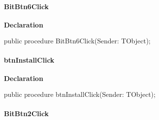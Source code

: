 \documentclass{report}
\newif\ifpdf
\begin{document}
\paragraph*{BitBtn6Click}\hspace*{\fill}

\label{manager.TMnFrm-BitBtn6Click}
\begin{list}{}{
\setlength{\itemindent}{0cm}
\setlength{\listparindent}{0cm}
\setlength{\leftmargin}{\evensidemargin}
\addtolength{\leftmargin}{\tmplength}
\settowidth{\labelsep}{X}
\addtolength{\leftmargin}{\labelsep}
\setlength{\labelwidth}{\tmplength}
}
\item[\textbf{Declaration}\hfill]
\ifpdf
\begin{flushleft}
\fi
\begin{ttfamily}
public procedure BitBtn6Click(Sender: TObject);\end{ttfamily}

\ifpdf
\end{flushleft}
\fi

\end{list}
\paragraph*{btnInstallClick}\hspace*{\fill}

\label{manager.TMnFrm-btnInstallClick}
\begin{list}{}{
\setlength{\itemindent}{0cm}
\setlength{\listparindent}{0cm}
\setlength{\leftmargin}{\evensidemargin}
\addtolength{\leftmargin}{\tmplength}
\settowidth{\labelsep}{X}
\addtolength{\leftmargin}{\labelsep}
\setlength{\labelwidth}{\tmplength}
}
\item[\textbf{Declaration}\hfill]
\ifpdf
\begin{flushleft}
\fi
\begin{ttfamily}
public procedure btnInstallClick(Sender: TObject);\end{ttfamily}

\ifpdf
\end{flushleft}
\fi

\end{list}
\paragraph*{BitBtn2Click}\hspace*{\fill}
\end{document}
